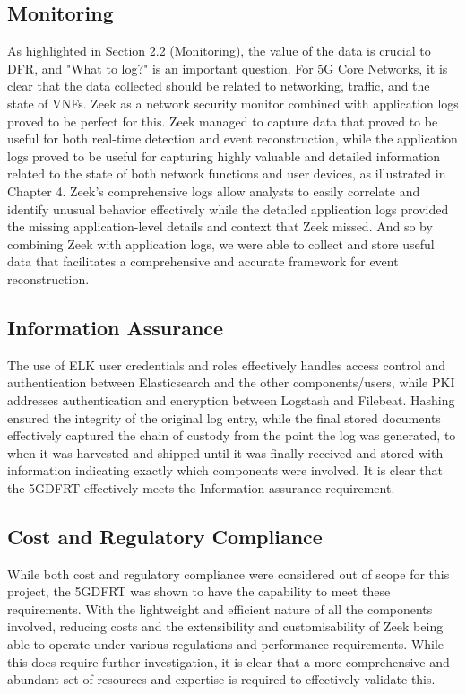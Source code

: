\documentclass[final,1p,times,authoryear]{elsarticle}
\begin{document}
\subsection{Monitoring}
\label{sub5sec1}
As highlighted in Section 2.2 (Monitoring), the value of the data is crucial to DFR, and "What to log?" is an important question. For 5G Core Networks, it is clear that the data collected should be related to networking, traffic, and the state of VNFs. Zeek as a network security monitor combined with application logs proved to be perfect for this. Zeek managed to capture data that proved to be useful for both real-time detection and event reconstruction, while the application logs proved to be useful for capturing highly valuable and detailed information related to the state of both network functions and user devices, as illustrated in Chapter 4. Zeek's comprehensive logs allow analysts to easily correlate and identify unusual behavior effectively while the detailed application logs provided the missing application-level details and context that Zeek missed. And so by combining Zeek with application logs, we were able to collect and store useful data that facilitates a comprehensive and accurate framework for event reconstruction.

\subsection{Information Assurance}
\label{sub5sec2}
The use of ELK user credentials and roles effectively handles access control and authentication between Elasticsearch and the other components/users, while PKI addresses authentication and encryption between Logstash and Filebeat. Hashing ensured the integrity of the original log entry, while the final stored documents effectively captured the chain of custody from the point the log was generated, to when it was harvested and shipped until it was finally received and stored with information indicating exactly which components were involved. It is clear that the 5GDFRT effectively meets the Information assurance requirement.

\subsection{Cost and Regulatory Compliance}
\label{sub5sec3}
While both cost and regulatory compliance were considered out of scope for this project, the 5GDFRT was shown to have the capability to meet these requirements. With the lightweight and efficient nature of all the components involved, reducing costs and the extensibility and customisability of Zeek being able to operate under various regulations and performance requirements. While this does require further investigation, it is clear that a more comprehensive and abundant set of resources and expertise is required to effectively validate this.
\end{document}
